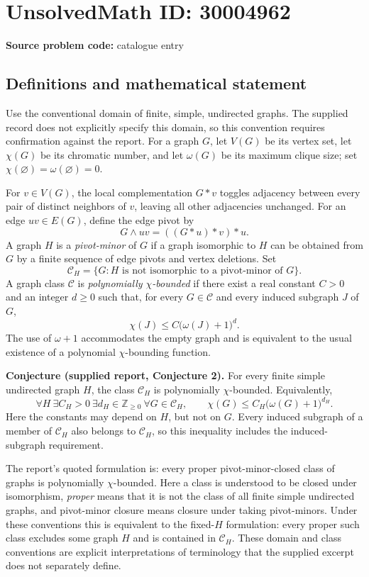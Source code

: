\documentclass[11pt]{article}
\begin{document}
\section*{UnsolvedMath ID: 30004962}
\textbf{Source problem code:} catalogue entry
\subsection{Definitions and mathematical statement}
Use the conventional domain of finite, simple, undirected graphs. The supplied record does not explicitly specify this domain, so this convention requires confirmation against the report. For a graph \(G\), let \(V(G)\) be its vertex set, let \(\chi(G)\) be its chromatic number, and let \(\omega(G)\) be its maximum clique size; set \(\chi(\varnothing)=\omega(\varnothing)=0\).

For \(v\in V(G)\), the local complementation \(G*v\) toggles adjacency between every pair of distinct neighbors of \(v\), leaving all other adjacencies unchanged. For an edge \(uv\in E(G)\), define the edge pivot by
\[
G\wedge uv=((G*u)*v)*u.
\]
A graph \(H\) is a \emph{pivot-minor} of \(G\) if a graph isomorphic to \(H\) can be obtained from \(G\) by a finite sequence of edge pivots and vertex deletions. Set
\[
\mathcal C_H=\{G:H\text{ is not isomorphic to a pivot-minor of }G\}.
\]
A graph class \(\mathcal C\) is \emph{polynomially \(\chi\)-bounded} if there exist a real constant \(C>0\) and an integer \(d\geq 0\) such that, for every \(G\in\mathcal C\) and every induced subgraph \(J\) of \(G\),
\[
\chi(J)\leq C\bigl(\omega(J)+1\bigr)^d.
\]
The use of \(\omega+1\) accommodates the empty graph and is equivalent to the usual existence of a polynomial \(\chi\)-bounding function.

\textbf{Conjecture (supplied report, Conjecture 2).} For every finite simple undirected graph \(H\), the class \(\mathcal C_H\) is polynomially \(\chi\)-bounded. Equivalently,
\[
\forall H\ \exists C_H>0\ \exists d_H\in\mathbb Z_{\geq 0}\ \forall G\in\mathcal C_H,
\qquad
\chi(G)\leq C_H\bigl(\omega(G)+1\bigr)^{d_H}.
\]
Here the constants may depend on \(H\), but not on \(G\). Every induced subgraph of a member of \(\mathcal C_H\) also belongs to \(\mathcal C_H\), so this inequality includes the induced-subgraph requirement.

The report's quoted formulation is: every proper pivot-minor-closed class of graphs is polynomially \(\chi\)-bounded. Here a class is understood to be closed under isomorphism, \emph{proper} means that it is not the class of all finite simple undirected graphs, and pivot-minor closure means closure under taking pivot-minors. Under these conventions this is equivalent to the fixed-\(H\) formulation: every proper such class excludes some graph \(H\) and is contained in \(\mathcal C_H\). These domain and class conventions are explicit interpretations of terminology that the supplied excerpt does not separately define.
\end{document}
